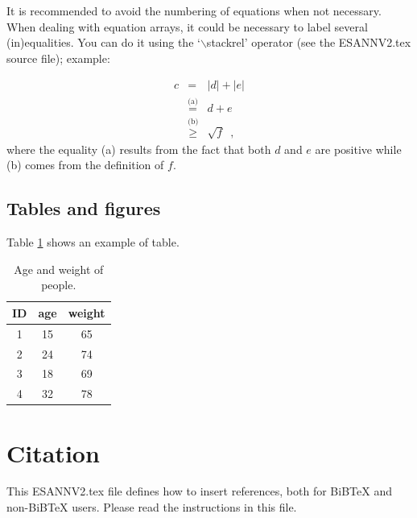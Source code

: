 \documentclass[0pt]{esannV2}
\begin{document}
It is recommended to avoid the numbering of equations when not
necessary. When dealing with equation arrays, it could be
necessary to label several (in)equalities. You can do it using the
`$\backslash$stackrel' operator (see the ESANNV2.tex source file);
example:

\begin{eqnarray}
c&=&|d|+|e|\nonumber\\
&\stackrel{\text{(a)}}{=}&d+e\nonumber\\
&\stackrel{\text{(b)}}{\geq}&\sqrt{f}\enspace,
\end{eqnarray}
\noindent where the equality (a) results from the fact that both
$d$ and $e$ are positive while (b) comes from the definition of
$f$.

\subsection{Tables and figures}


Table \ref{Tab:AgeWeight} shows an example of table.

\begin{table}[h!]
  \centering
  \begin{tabular}{|c|c|c|}
    \hline
    ID & age & weight \\
    \hline
    1& 15 & 65 \\
    2& 24 & 74\\
    3& 18 & 69 \\
    4& 32 & 78 \\
    \hline
  \end{tabular}
  \caption{Age and weight of people.}\label{Tab:AgeWeight}
\end{table}

\section{Citation}
This ESANNV2.tex file defines how to insert references, both for
BiBTeX and non-BiBTeX users.  Please read the instructions in this
file.

\end{document}
